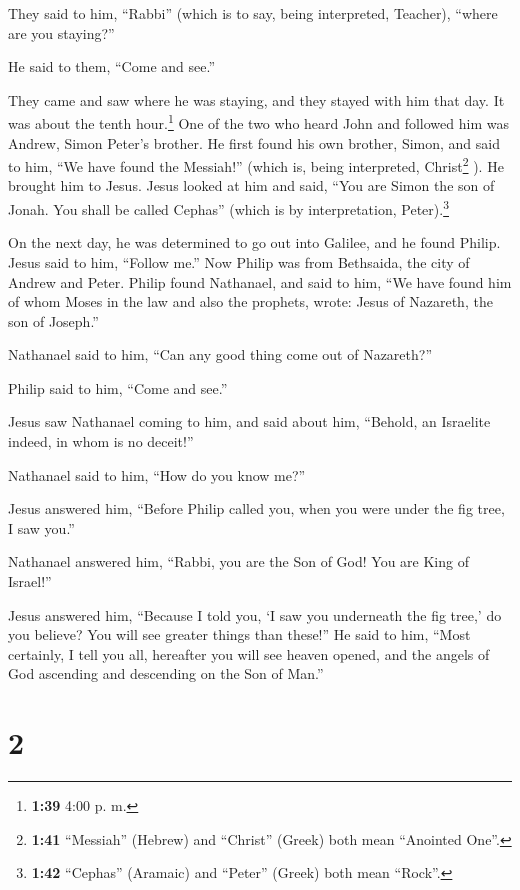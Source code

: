 They said to him, ``Rabbi'' (which is to say, being interpreted,
Teacher), ``where are you staying?''

 He said to them, ``Come and see.''

They came and saw where he was staying, and they stayed with him that
day. It was about the tenth hour.\footnote{\textbf{1:39} 4:00 p. m.}
 One of the two who heard John and followed him was
Andrew, Simon Peter's brother.  He first found his own
brother, Simon, and said to him, ``We have found the Messiah!'' (which
is, being interpreted, Christ\footnote{\textbf{1:41} ``Messiah''
  (Hebrew) and ``Christ'' (Greek) both mean ``Anointed One''.} ).
 He brought him to Jesus. Jesus looked at him and said,
``You are Simon the son of Jonah. You shall be called Cephas'' (which is
by interpretation, Peter).\footnote{\textbf{1:42} ``Cephas'' (Aramaic)
  and ``Peter'' (Greek) both mean ``Rock''.}

 On the next day, he was determined to go out into
Galilee, and he found Philip. Jesus said to him, ``Follow me.''
 Now Philip was from Bethsaida, the city of Andrew and
Peter.  Philip found Nathanael, and said to him, ``We
have found him of whom Moses in the law and also the prophets, wrote:
Jesus of Nazareth, the son of Joseph.''

 Nathanael said to him, ``Can any good thing come out of
Nazareth?''

Philip said to him, ``Come and see.''

 Jesus saw Nathanael coming to him, and said about him,
``Behold, an Israelite indeed, in whom is no deceit!''

 Nathanael said to him, ``How do you know me?''

Jesus answered him, ``Before Philip called you, when you were under the
fig tree, I saw you.''

 Nathanael answered him, ``Rabbi, you are the Son of God!
You are King of Israel!''

 Jesus answered him, ``Because I told you, `I saw you
underneath the fig tree,' do you believe? You will see greater things
than these!''  He said to him, ``Most certainly, I tell
you all, hereafter you will see heaven opened, and the angels of God
ascending and descending on the Son of Man.''

\hypertarget{section-1}{%
\section{2}\label{section-1}}

